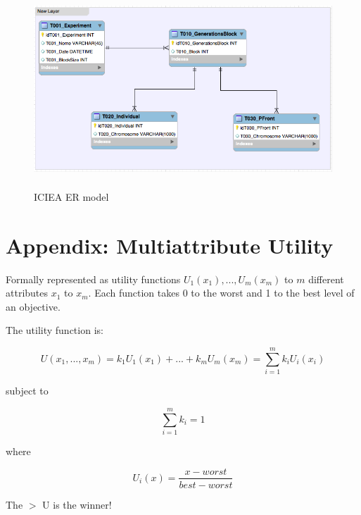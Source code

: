 \documentclass{llncs}
\begin{document}
\begin{figure}
\centering
\includegraphics[height=2.9in,width=5in]{er.png}
\caption{ICIEA ER model}
\label{fig:er}
\end{figure}
\FloatBarrier

\section{Appendix: Multiattribute Utility}

Formally represented as utility functions $U_1(x_1),...,U_m(x_m)$ to $m$ different attributes $x_1$ to $x_m$. Each function takes 0 to the worst and 1 to the best level of an objective.

The utility function is:
 

\begin{equation}
U(x_1,...,x_m)=k_1U_1(x_1)+...+k_mU_m(x_m)=\sum\limits_{i=1}^{m} k_iU_i(x_i)
\end{equation}


subject to 

\begin{equation}
 \sum\limits_{i=1}^{m} k_i=1 
\end{equation}

where 


\begin{equation}
U_i(x) = \frac{x-worst}{best-worst}
\end{equation}

The $>$ U is the winner!



%
%
\newpage


%
\end{document}
